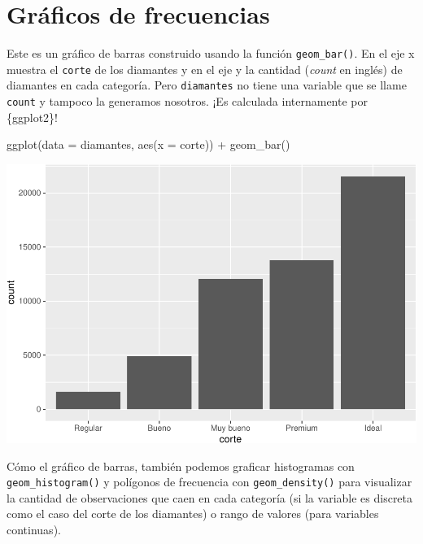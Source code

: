 \documentclass[
  openany]{book}
\newenvironment{Shaded}{\begin{snugshade}}{\end{snugshade}}
\newcommand{\AttributeTok}[1]{\textcolor[rgb]{0.77,0.63,0.00}{#1}}
\newcommand{\FunctionTok}[1]{\textcolor[rgb]{0.00,0.00,0.00}{#1}}
\newcommand{\NormalTok}[1]{#1}
\newcommand{\SpecialCharTok}[1]{\textcolor[rgb]{0.00,0.00,0.00}{#1}}
\begin{document}
\hypertarget{gruxe1ficos-de-frecuencias}{%
\section{Gráficos de frecuencias}\label{gruxe1ficos-de-frecuencias}}

Este es un gráfico de barras construido usando la función \texttt{geom\_bar()}.
En el eje x muestra el \texttt{corte} de los diamantes y en el eje y la cantidad (\emph{count} en inglés) de diamantes en cada categoría.
Pero \texttt{diamantes} no tiene una variable que se llame \texttt{count} y tampoco la generamos nosotros.
¡Es calculada internamente por \{ggplot2\}!

\begin{Shaded}
\begin{Highlighting}[]
\FunctionTok{ggplot}\NormalTok{(}\AttributeTok{data =}\NormalTok{ diamantes, }\FunctionTok{aes}\NormalTok{(}\AttributeTok{x =}\NormalTok{ corte)) }\SpecialCharTok{+}
  \FunctionTok{geom\_bar}\NormalTok{()}
\end{Highlighting}
\end{Shaded}

\begin{center}\includegraphics[width=1\linewidth]{DT6_files/figure-latex/unnamed-chunk-60-1} \end{center}

Cómo el gráfico de barras, también podemos graficar histogramas con \texttt{geom\_histogram()} y polígonos de frecuencia con \texttt{geom\_density()} para visualizar la cantidad de observaciones que caen en cada categoría (si la variable es discreta como el caso del corte de los diamantes) o rango de valores (para variables continuas).
\end{document}
